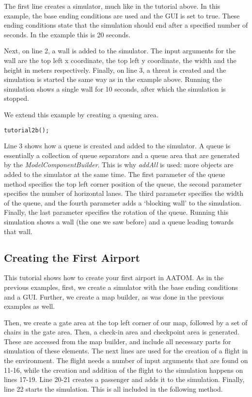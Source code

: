 \documentclass{article}
\begin{document}
The first line creates a simulator, much like in the tutorial above. In this example, the base ending conditions are used and the GUI is set to true. These ending conditions state that the simulation should end after a specified number of seconds. In the example this is 20 seconds.

Next, on line 2, a wall is added to the simulator. The input arguments for the wall are the top left x coordinate, the top left y coordinate, the width and the height in meters respectively. Finally, on line 3, a threat is created and the simulation is started the same way as in the example above. Running the simulation shows a single wall for 10 seconds, after which the simulation is stopped.

We extend this example by creating a queuing area.

\begin{verbatim}
tutorial2b();
\end{verbatim}

Line 3 shows how a queue is created and added to the simulator. A queue is essentially a collection of queue separators and a queue area that are generated by the \textit{ModelComponentBuilder}. This is why \textit{addAll} is used: more objects are added to the simulator at the same time. The first parameter of the queue method specifies the top left corner position of the queue, the second parameter specifies the number of horizontal lanes. The third parameter specifies the width of the queue, and the fourth parameter adds a `blocking wall' to the simulation. Finally, the last parameter specifies the rotation of the queue. Running this simulation shows a wall (the one we saw before) and a queue leading towards that wall.

\subsection{Creating the First Airport}
This tutorial shows how to create your first airport in AATOM. As in the previous examples, first, we create a simulator with the base ending conditions and a GUI. Further, we create a map builder, as was done in the previous examples as well.

Then, we create a gate area at the top left corner of our map, followed by a set of chairs in the gate area. Then, a check-in area and checkpoint area is generated. These are accessed from the map builder, and include all necessary parts for simulation of these elements. The next lines are used for the creation of a flight in the environment. The flight needs a number of input arguments that are found on 11-16, while the creation and addition of the flight to the simulation happens on lines 17-19. Line 20-21 creates a passenger and adds it to the simulation. Finally, line 22 starts the simulation. This is all included in the following method.
\end{document}
